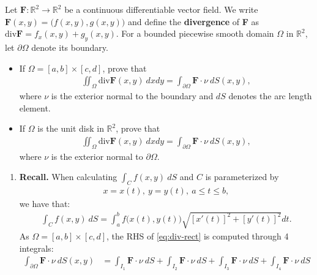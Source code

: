 \begin{problem}
\label{prob:divergence}Let $\mathbf{F}: \mathbb{R}^2 \rightarrow \mathbb{R}^2$ be a continuous differentiable vector field. We write $\mathbf{F}(x,y) = \big( f(x,y), g(x,y)\big)$ and define the \textbf{divergence} of \textbf{F} as $\mathrm{div}\mathbf{F}=f_x (x,y) + g_y (x,y)$. For a bounded piecewise smooth domain $\Omega$ in $\mathbb{R}^2$, let $\partial\Omega$ denote its boundary.   
\begin{itemize}
    \item[(a)] If $\Omega=[a,b]\times [c,d]$, prove that 
    \begin{align}\label{eq:div-rect}
        \displaystyle\iint_{\Omega} \mathrm{div}\mathbf{F}(x,y)\ dx dy = \displaystyle\int_{\partial\Omega}\mathbf{F}\cdot \nu\ dS(x,y), 
    \end{align}
    where $\nu$ is the exterior normal to the boundary and $dS$ denotes the arc length element. 
    \item[(b)] If $\Omega$ is the unit disk in $\mathbb{R}^2$, prove that 
    \begin{align}\label{eq:div-disk}
        \displaystyle\iint_{\Omega} \mathrm{div}\mathbf{F}(x,y)\ dxdy = \displaystyle\int_{\partial\Omega}\mathbf{F}\cdot \nu \ dS(x,y),
    \end{align}
    where $\nu$ is the exterior normal to $\partial\Omega$.
\end{itemize}
\begin{solution}
\begin{enumerate}
    \item[(a)] \quad 
    \textbf{Recall.} When calculating $\displaystyle\int_{C}f(x,y)\ dS$ and $C$ is parameterized by 
    \begin{align*}
        x=x(t),\ y=y(t),\ a\le t\le b,
    \end{align*}
    we have that:
    \begin{align*}
        \displaystyle\int_{C}f(x,y)\ dS = \displaystyle\int_a^b f\big( x(t),y(t) \big) \sqrt{[x'(t)]^2+[y'(t)]^2} dt.
    \end{align*}
    As $\Omega = [a,b] \times [c,d]$, the RHS of \eqref{eq:div-rect} is computed through 4 integrals:
    \begin{align*}
        \displaystyle\int_{\partial\Omega}\mathbf{F}\cdot \nu\ dS(x,y) &= \displaystyle\int_{I_1}\mathbf{F}\cdot \nu\ dS + \displaystyle\int_{I_2}\mathbf{F}\cdot \nu\ dS + \displaystyle\int_{I_3}\mathbf{F}\cdot \nu\ dS + 
        \displaystyle\int_{I_4}\mathbf{F}\cdot \nu\ dS \\

\end{align*}
\end{enumerate}
\end{solution}
\end{problem}
